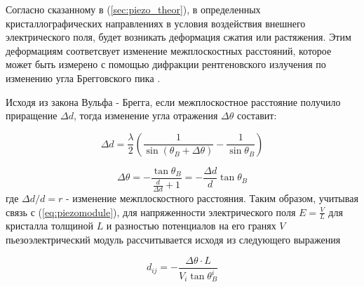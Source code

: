 Согласно сказанному в (\ref{sec:piezo_theor}), в определенных кристаллографических направлениях в
условия воздействия внешнего электрического поля, будет возникать деформация
сжатия или растяжения. Этим деформациям соответсвует изменение межплоскостных
 расстояний, которое может быть измерено с помощью дифракции рентгеновского
 излучения по изменению угла Брегговского пика \cite{marchenkov2014}.

Исходя из закона Вульфа - Брегга, если межплоскостное расстояние получило приращение
$\Delta d$, тогда изменение угла отражения $\Delta \theta$ составит:

$$ \Delta d = \frac{\lambda}{2}\left( \frac{1}{\sin(\theta_B + \Delta \theta) } - \frac{1}{\sin \theta_B } \right) $$

\begin{equation}
   \Delta \theta =-  \frac{\tan \theta_B}{\frac{d}{\Delta d}+1}  = -  \frac{\Delta d }{d}  \tan \theta_B
\end{equation}
где $\Delta d/d = r$ - изменение межплоскостного расстояния. Таким образом, учитывая связь с
(\ref{eq:piezomodule}), для напряженности электрического поля $E = \frac{V}{L}$ для
 кристалла толщиной $L$ и разностью потенциалов на его гранях $V$ пьезоэлектрический модуль
 рассчитывается исходя из следующего выражения

 \begin{equation}
    d_{ij} = -\frac{\Delta \theta \cdot L}{V_i \tan \theta_B^i}
 \end{equation}
